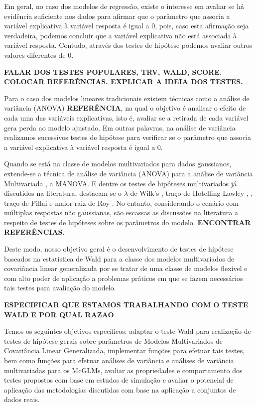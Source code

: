 Em geral, no caso dos modelos de regressão, existe o interesse em avaliar se há evidência suficiente nos dados para afirmar que o parâmetro que associa a variável explicativa à variável resposta é igual a 0, pois, caso esta afirmação seja verdadeira, podemos concluir que a variável explicativa não está associada à variável resposta. Contudo, através dos testes de hipótese podemos avaliar outros valores diferentes de 0. 



\textbf{FALAR DOS TESTES POPULARES, TRV, WALD, SCORE. COLOCAR REFERÊNCIAS. EXPLICAR A IDEIA DOS TESTES.}

Para o caso dos modelos lineares tradicionais existem técnicas como a análise de variância (ANOVA) \textbf{REFERÊNCIA}, na qual o objetivo é analisar o efeito de cada uma das variáveis explicativas, isto é, avaliar se a retirada de cada variável gera perda ao modelo ajustado. Em outras palavras, na análise de variância realizamos sucessivos testes de hipótese para verificar se o parâmetro que associa a variável explicativa à variável resposta é igual a 0.

Quando se está na classe de modelos multivariados para dados gaussianos, extende-se a técnica de análise de variância (ANOVA) para a análise de variância  Multivariada \citep{manova}, a MANOVA. E dentre os testes de hipóteses multivariados já discutidos na literatura, destacam-se o $\lambda$ de Wilk's \citep{wilks}, traço de Hotelling-Lawley \citep{lawley}, \citep{hotelling}, traço de Pillai \citep{pillai} e maior raiz de Roy \citep{roy}. No entanto, considerando o cenário com múltiplas respostas não gaussianas, são escassas as discussões na literatura a respeito de testes de hipóteses sobre os parâmetros do modelo. \textbf{ENCONTRAR REFERÊNCIAS}.

Deste modo, nosso objetivo geral é o desenvolvimento de testes de hipótese baseados na estatística de Wald para a classe dos modelos multivariados de covariância linear generalizada por se tratar de uma classe de modelos flexível e com alto poder de aplicação a problemas práticos em que se fazem necessários tais testes para avaliação do modelo.

\textbf{ESPECIFICAR QUE ESTAMOS TRABALHANDO COM O TESTE WALD E POR QUAL RAZAO}

Temos os seguintes objetivos específicos: adaptar o teste Wald para realização de testes de hipótese gerais sobre parâmetros de Modelos Multivariados de Covariância Linear Generalizada, implementar funções para efetuar tais testes, bem como funções para efetuar análises de variância e análises de variância multivariadas para os McGLMs, avaliar as propriedades e comportamento dos testes propostos com base em estudos de simulação e avaliar o potencial de aplicação das metodologias discutidas com base na aplicação a conjuntos de dados reais.

